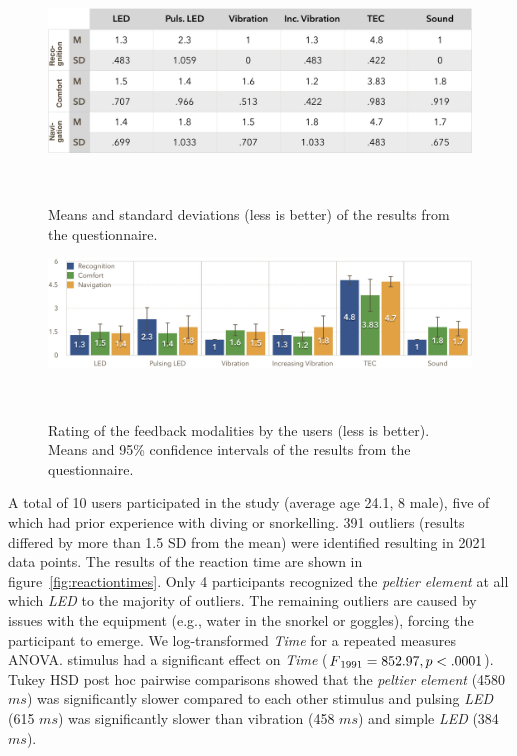 \begin{figure}
	\includegraphics[width=\columnwidth]{images/m_sd_table_noranking}
	\caption{Means and standard deviations (less is better) of the results from the questionnaire.}~\label{fig:m_sd_table}
\end{figure}

\begin{figure}
	\includegraphics[width=\columnwidth]{images/GraphQuestionnaireNoranking.png}
	\caption{Rating of the feedback modalities by the users (less is better). Means and 95\% confidence intervals of the results from the questionnaire.}~\label{fig:questionnaire}
\end{figure}

A total of 10 users participated in the study (average age 24.1, 8 male), five of which had prior experience with diving or snorkelling. 
391 outliers (results differed by more than 1.5 SD from the mean) were identified resulting in 2021 data points.
The results of the reaction time are shown in figure~\ref{fig:reactiontimes}.
Only 4 participants recognized the \emph{peltier element} at all which \emph{LED} to the majority of outliers. 
The remaining outliers are caused by issues with the equipment (e.g., water in the snorkel or goggles), forcing the participant to emerge.
We log-transformed \emph{Time} for a repeated measures ANOVA. 
{\sc stimulus} had a significant effect on \emph{Time} ($F\textsubscript{1991} = 852.97, p<.0001$). 
Tukey HSD post hoc pairwise comparisons showed that the \emph{peltier element} (4580$ms$) was significantly slower compared to each other {\sc stimulus} and pulsing \emph{LED} (615 $ms$) was significantly slower than vibration (458 $ms$) and simple \emph{LED} (384$ms$).

